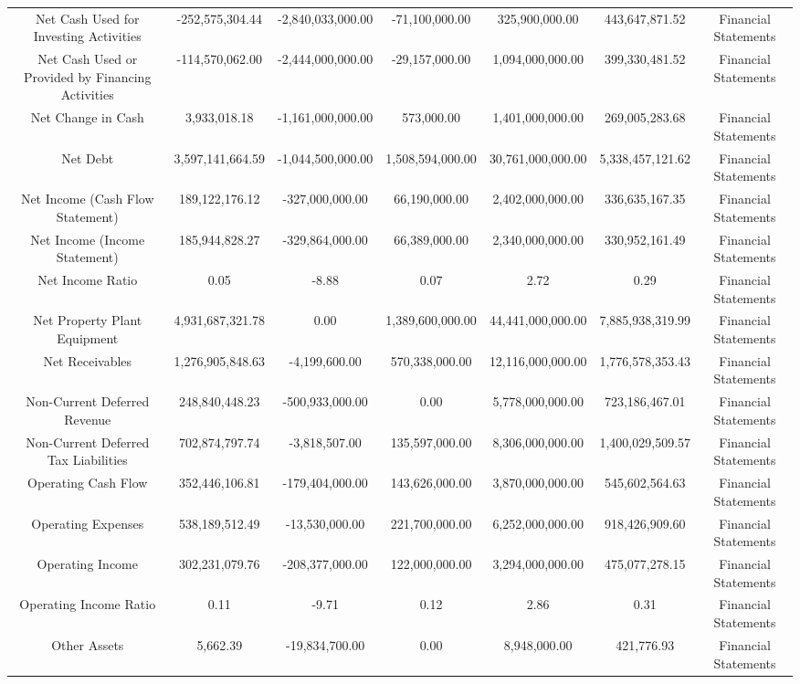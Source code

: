 \begin{longtable}{ccccccc}
Net Cash Used for Investing Activities & -252,575,304.44 & -2,840,033,000.00 & -71,100,000.00 & 325,900,000.00 & 443,647,871.52 & Financial Statements \\
Net Cash Used or Provided by Financing Activities & -114,570,062.00 & -2,444,000,000.00 & -29,157,000.00 & 1,094,000,000.00 & 399,330,481.52 & Financial Statements \\
Net Change in Cash & 3,933,018.18 & -1,161,000,000.00 & 573,000.00 & 1,401,000,000.00 & 269,005,283.68 & Financial Statements \\
Net Debt & 3,597,141,664.59 & -1,044,500,000.00 & 1,508,594,000.00 & 30,761,000,000.00 & 5,338,457,121.62 & Financial Statements \\
Net Income (Cash Flow Statement) & 189,122,176.12 & -327,000,000.00 & 66,190,000.00 & 2,402,000,000.00 & 336,635,167.35 & Financial Statements \\
Net Income (Income Statement) & 185,944,828.27 & -329,864,000.00 & 66,389,000.00 & 2,340,000,000.00 & 330,952,161.49 & Financial Statements \\
Net Income Ratio & 0.05 & -8.88 & 0.07 & 2.72 & 0.29 & Financial Statements \\
Net Property Plant Equipment & 4,931,687,321.78 & 0.00 & 1,389,600,000.00 & 44,441,000,000.00 & 7,885,938,319.99 & Financial Statements \\
Net Receivables & 1,276,905,848.63 & -4,199,600.00 & 570,338,000.00 & 12,116,000,000.00 & 1,776,578,353.43 & Financial Statements \\
Non-Current Deferred Revenue & 248,840,448.23 & -500,933,000.00 & 0.00 & 5,778,000,000.00 & 723,186,467.01 & Financial Statements \\
Non-Current Deferred Tax Liabilities & 702,874,797.74 & -3,818,507.00 & 135,597,000.00 & 8,306,000,000.00 & 1,400,029,509.57 & Financial Statements \\
Operating Cash Flow & 352,446,106.81 & -179,404,000.00 & 143,626,000.00 & 3,870,000,000.00 & 545,602,564.63 & Financial Statements \\
Operating Expenses & 538,189,512.49 & -13,530,000.00 & 221,700,000.00 & 6,252,000,000.00 & 918,426,909.60 & Financial Statements \\
Operating Income & 302,231,079.76 & -208,377,000.00 & 122,000,000.00 & 3,294,000,000.00 & 475,077,278.15 & Financial Statements \\
Operating Income Ratio & 0.11 & -9.71 & 0.12 & 2.86 & 0.31 & Financial Statements \\
Other Assets & 5,662.39 & -19,834,700.00 & 0.00 & 8,948,000.00 & 421,776.93 & Financial Statements \\

\end{longtable}
